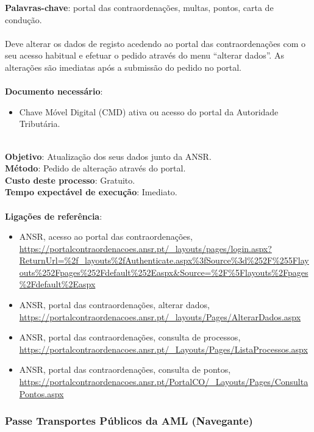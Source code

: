 \textbf{Palavras-chave}: portal das contraordenações, multas, pontos, carta de condução. \\
\\
Deve alterar os dados de registo acedendo ao portal das contraordenações
com o seu acesso habitual e efetuar o pedido através do menu ``alterar
dados''. As alterações são imediatas após a submissão do pedido no
portal.\\
\\
\textbf{Documento necessário}:
\begin{itemize}
	\item Chave Móvel Digital (CMD) ativa ou acesso do portal da Autoridade Tributária.
\end{itemize}
\leavevmode\\
\textbf{Objetivo}: Atualização dos seus dados junto da ANSR. \\
\textbf{Método}: Pedido de alteração através do portal. \\
\textbf{Custo deste processo}: Gratuito. \\
\textbf{Tempo expectável de execução}: Imediato. \\
\\
\textbf{Ligações de referência}:
\begin{itemize}
	\item ANSR, acesso ao portal das contraordenações, \url{https://portalcontraordenacoes.ansr.pt/\_layouts/pages/login.aspx?ReturnUrl=\%2f\_layouts\%2fAuthenticate.aspx\%3fSource\%3d\%252F\%255Flayouts\%252Fpages\%252Fdefault\%252Easpx\&Source=\%2F\%5Flayouts\%2Fpages\%2Fdefault\%2Easpx}
	\item ANSR, portal das contraordenações, alterar dados, \url{https://portalcontraordenacoes.ansr.pt/\_layouts/Pages/AlterarDados.aspx}
	\item ANSR, portal das contraordenações, consulta de processos, \url{https://portalcontraordenacoes.ansr.pt/\_Layouts/Pages/ListaProcessos.aspx}
	\item ANSR, portal das contraordenações, consulta de pontos, \url{https://portalcontraordenacoes.ansr.pt/PortalCO/\_Layouts/Pages/ConsultaPontos.aspx}
\end{itemize}

\subsubsection{Passe Transportes Públicos da AML (Navegante)}

